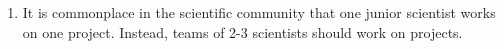 \begin{enumerate}[nosep]
    \item 
    It is commonplace in the scientific community that 
    one junior scientist works on one project. 
    Instead, 
    teams of 2-3 scientists should work on projects. 

\end{enumerate}
